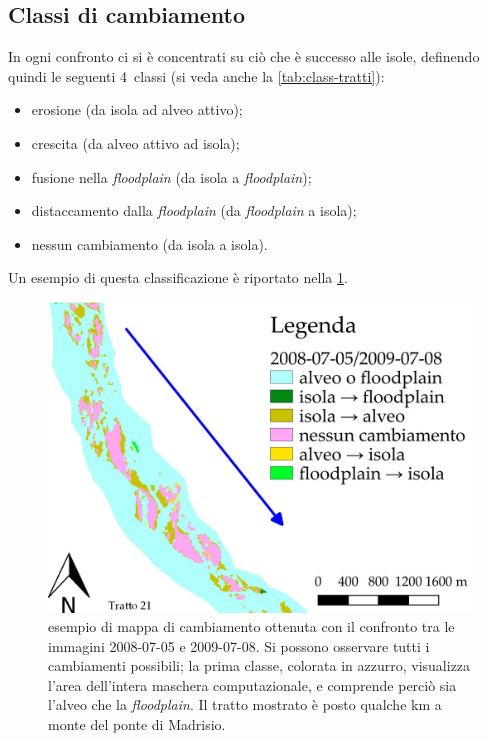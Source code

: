 \subsection{Classi di cambiamento}
In ogni confronto ci si è concentrati su ciò che è successo alle isole, definendo quindi le seguenti 4~classi (si veda anche la \cref{tab:class-tratti}):
%
\begin{itemize}
	\item erosione (da isola ad alveo attivo);
	\item crescita (da alveo attivo ad isola);
	\item fusione nella \emph{floodplain} (da isola a \emph{floodplain});
	\item distaccamento dalla \emph{floodplain} (da \emph{floodplain} a isola);
	\item nessun cambiamento (da isola a isola).
\end{itemize}
%
Un esempio di questa classificazione è riportato nella \cref{fig:confr-class-is-fl}.
%
\begin{figure}
	\centering
	\includegraphics[width=.8\textwidth]{files/confr_class_is_fl.jpeg}
	\caption[esempio di mappa di cambiamento]{esempio di mappa di cambiamento ottenuta con il confronto tra le immagini \AST{} 2008-07-05 e 2009-07-08. Si possono osservare tutti i cambiamenti possibili; la prima classe, colorata in azzurro, visualizza l'area dell'intera maschera computazionale, e comprende perciò sia l'alveo che la \emph{floodplain}. Il tratto mostrato è posto qualche \si{\kilo\m} a monte del ponte di Madrisio.}
	\label{fig:confr-class-is-fl}
\end{figure}
%

